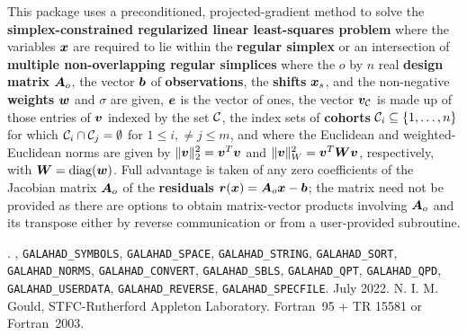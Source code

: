 \documentclass{galahad}
\newcommand{\packagename}{SLLS}
\newcommand{\fullpackagename}{\libraryname\_\packagename}
\begin{document}
\galheader


\galsummary
This package uses a preconditioned, projected-gradient method
to solve the {\bf simplex-constrained regularized linear least-squares problem}
where the variables ${\bm{x}}$ are required to lie within the
{\bf regular simplex}
or an intersection of {\bf multiple non-overlapping regular simplices}
where the $o$ by $n$ real {\bf design matrix} ${\bm{A}}_o$, the vector ${\bm{b}}$
of {\bf observations}, the {\bf shifts} ${\bm{x}}_s$,
and the non-negative {\bf weights} ${\bm{w}}$ and $\sigma$ are given, 
${\bm{e}}$ is the vector of ones, 
the vector $\bmv_{\calC}$ is made up of those entries of ${\bm{v}}$ indexed by
the set $\calC$, 
the index sets of {\bf cohorts} $\calC_i \subseteq \{1,\ldots,n\}$
for which $\calC_i \cap \calC_j = \emptyset$ for $1 \leq i, \neq j \leq m$,
and where the Euclidean and weighted-Euclidean norms
are given by $\|{\bm{v}}\|_2^2 = {\bm{v}}^T {\bm{v}}$ and $\|{\bm{v}}\|_W^2 = {\bm{v}}^T {\bm{W}} {\bm{v}}$,
respectively, with ${\bm{W}} = \mbox{diag}({\bm{w}})$.
Full advantage is taken of any zero coefficients of the Jacobian matrix ${\bm{A}}_o$
of the {\bf residuals} ${\bm{r}}({\bm{x}}) = {\bm{A}}_o {\bm{x}} - {\bm{b}}$;
the matrix need not be provided as there are options to obtain matrix-vector
products involving ${\bm{A}}_o$ and its transpose either by reverse communication
or from a user-provided subroutine.


\galattributes
\galversions{\tt  \fullpackagename\_single, \fullpackagename\_double}.
,
{\tt GALAHAD\-\_SY\-M\-BOLS},
{\tt GALAHAD\-\_\-SPACE},
{\tt GALAHAD\_STRING},
{\tt GALAHAD\_SORT},
{\tt GALAHAD\_NORMS},
{\tt GALAHAD\_CONVERT},
{\tt GALAHAD\_SBLS},
{\tt GALAHAD\_QPT},
{\tt GALAHAD\_QPD},
{\tt GALAHAD\_USERDATA},
{\tt GALAHAD\_REVERSE},
{\tt GALAHAD\_SPECFILE}.
\galdate July 2022.
\galorigin N. I. M. Gould, STFC-Rutherford Appleton Laboratory.
\gallanguage Fortran~95 + TR 15581 or Fortran~2003.


\galhowto


\end{document}
